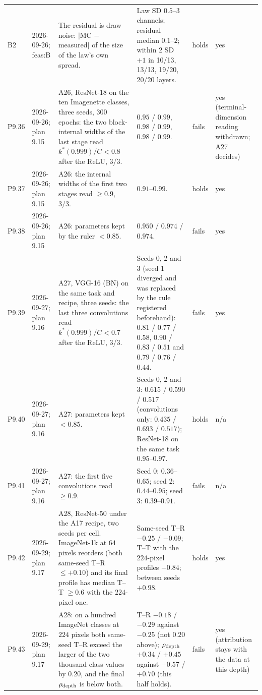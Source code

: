 \begin{longtable}{p{1.1cm}p{1.4cm}p{6.2cm}p{4.6cm}p{2.0cm}p{1.6cm}}
B2 & 2026-09-26; feas:B & The residual is draw noise: $|$MC $-$ measured$|$ of the size of the law's own spread. & Law SD $0.5$--$3$ channels; residual median $0.1$--$2$; within 2 SD $+ 1$ in 10/13, 13/13, 19/20, 20/20 layers. & holds & yes \\
P9.36 & 2026-09-26; plan 9.15 & A26, ResNet-18 on the ten Imagenette classes, three seeds, 300 epochs: the two block-internal widths of the last stage read $k^*(0.999)/C < 0.8$ after the ReLU, 3/3. & $0.95$ / $0.99$, $0.98$ / $0.99$, $0.98$ / $0.99$. & fails & yes (terminal-dimension reading withdrawn; A27 decides) \\
P9.37 & 2026-09-26; plan 9.15 & A26: the internal widths of the first two stages read $\ge 0.9$, 3/3. & $0.91$--$0.99$. & holds & yes \\
P9.38 & 2026-09-26; plan 9.15 & A26: parameters kept by the ruler $< 0.85$. & $0.950$ / $0.974$ / $0.974$. & fails & yes \\
P9.39 & 2026-09-27; plan 9.16 & A27, VGG-16 (BN) on the same task and recipe, three seeds: the last three convolutions read $k^*(0.999)/C < 0.7$ after the ReLU, 3/3. & Seeds 0, 2 and 3 (seed 1 diverged and was replaced by the rule registered beforehand): $0.81$ / $0.77$ / $0.58$, $0.90$ / $0.83$ / $0.51$ and $0.79$ / $0.76$ / $0.44$. & fails & yes \\
P9.40 & 2026-09-27; plan 9.16 & A27: parameters kept $< 0.85$. & Seeds 0, 2 and 3: $0.615$ / $0.590$ / $0.517$ (convolutions only: $0.435$ / $0.693$ / $0.517$); ResNet-18 on the same task $0.95$--$0.97$. & holds & n/a \\
P9.41 & 2026-09-27; plan 9.16 & A27: the first five convolutions read $\ge 0.9$. & Seed 0: $0.36$--$0.65$; seed 2: $0.44$--$0.95$; seed 3: $0.39$--$0.91$. & fails & n/a \\
P9.42 & 2026-09-29; plan 9.17 & A28, ResNet-50 under the A17 recipe, two seeds per cell. ImageNet-1k at $64$ pixels reorders (both same-seed T--R $\le +0.10$) and its final profile has median T--T $\ge 0.6$ with the $224$-pixel one. & Same-seed T--R $-0.25$ / $-0.09$; T--T with the $224$-pixel profiles $+0.84$; between seeds $+0.98$. & holds & yes \\
P9.43 & 2026-09-29; plan 9.17 & A28: on a hundred ImageNet classes at $224$ pixels both same-seed T--R exceed the larger of the two thousand-class values by $0.20$, and the final $\rho_{\rm depth}$ is below both. & T--R $-0.18$ / $-0.29$ against $-0.25$ (not $0.20$ above); $\rho_{\rm depth}$ $+0.34$ / $+0.45$ against $+0.57$ / $+0.70$ (this half holds). & fails & yes (attribution stays with the data at this depth) \\

\end{longtable}
